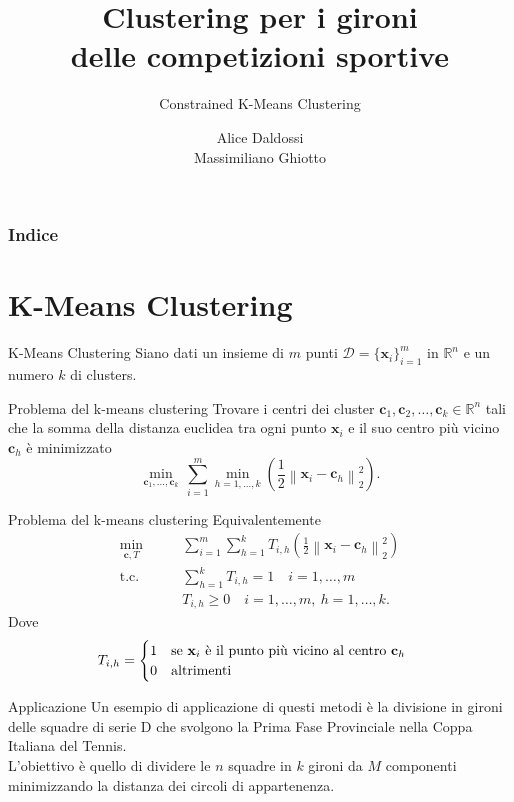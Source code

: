 \documentclass{beamer}
\title{Clustering per i gironi \\delle competizioni sportive}
\subtitle{Constrained K-Means Clustering}
\author{Alice Daldossi \\ Massimiliano Ghiotto}
\institute{Università degli Studi di Pavia}
\date
\begin{document}
	
	\frame{\titlepage}
	
\begin{frame}
	\frametitle{Indice}
	\tableofcontents
\end{frame}

\section{K-Means Clustering}
\begin{frame}{K-Means Clustering}
	Siano dati un insieme di $m$ punti $\mathcal{D} = \{\textbf{x}_i\}^m_{i=1}$ in $\mathbb{R}^n$ e un numero $k$ di clusters.
	\begin{block}{Problema del k-means clustering}
		Trovare i centri dei cluster $ \textbf{c}_1, \textbf{c}_2, \dots, \textbf{c}_k  \in \mathbb{R}^n$ tali che la somma della distanza euclidea tra ogni punto $ \textbf{x}_i $
		e il suo centro più vicino $ \textbf{c}_h $ è minimizzato
		\[ \underset{\textbf{c}_1, \dots, \textbf{c}_k}{\min}\, \sum_{i=1}^{m} \underset{h = 1, \dots, k}{\min} \left( \frac{1}{2} \left\| \textbf{x}_i - \textbf{c}_h \right\|^2_2  \right).  \]
	\end{block}
\end{frame}
\begin{frame}
	\begin{block}{Problema del k-means clustering}
		Equivalentemente
		\[ \begin{split}
			\underset{\textbf{c}, T}{\text{min}}&\qquad \sum_{i=1}^{m}\sum_{h=1}^{k} T_{i,h} \left( \frac{1}{2} \left\| \textbf{x}_i - \textbf{c}_h \right\|^2_2  \right) \\
			\text{t.c.}& \qquad\sum_{h=1}^{k} T_{i,h} = 1 \quad i = 1, \dots, m\\
			& \qquad T_{i,h} \ge 0 \quad i = 1, \dots, m,\ h = 1, \dots,k.
		\end{split} \]
	\vspace{-0.5cm}
	Dove 
	\[  T_{i,h} =\begin{cases}
		1 \quad \text{se $ \textbf{x}_i $ è il punto più vicino al centro $ \textbf{c}_h $}\\
		0\quad \text{altrimenti}
	\end{cases} \]
\vspace{-0.4cm}
	\end{block}
\end{frame}
\begin{frame}{Applicazione}
	Un esempio di applicazione di questi metodi è la divisione in gironi delle squadre di serie D che svolgono la Prima Fase Provinciale nella Coppa Italiana del Tennis.	\\
	L'obiettivo è quello di dividere le $n$ squadre in $k$ gironi da $M$ componenti minimizzando la distanza dei circoli di appartenenza.\\
\end{frame}
\end{document}
